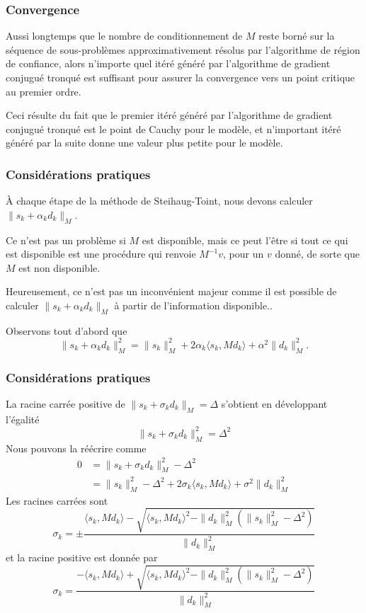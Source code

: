 \documentclass[usepdftitle=false]{beamer}
\begin{document}
\begin{frame}
\frametitle{Convergence}

Aussi longtemps que le nombre de conditionnement de $M$ reste borné sur la séquence de sous-problèmes approximativement résolus par l'algorithme de région de confiance, alors n'importe quel itéré généré par l'algorithme de gradient conjugué tronqué est suffisant pour assurer la convergence vers un point critique au premier ordre.

\mbox{}

Ceci résulte du fait que le premier itéré généré par l'algorithme de gradient conjugué tronqué est le point de Cauchy pour le modèle, et n'important itéré généré par la suite donne une valeur plus petite pour le modèle.

\end{frame}

\begin{frame}
\frametitle{Considérations pratiques}

À chaque étape de la méthode de Steihaug-Toint, nous devons calculer $\| s_k + \alpha_k d_k\|_M$.

\mbox{}

Ce n'est pas un problème si $M$ est disponible, mais ce peut l'être si tout ce qui est disponible est une procédure qui renvoie $M^{-1}v$, pour un $v$ donné, de sorte que $M$ est non disponible.

\mbox{}

Heureusement, ce n'est pas un inconvénient majeur comme il est possible de calculer  $\| s_k + \alpha_k d_k\|_M$ à partir de l'information disponible..

\mbox{}

Observons tout d'abord que
$$
\| s_k + \alpha_k d_k\|^2_M = \| s_k \|_M^2 + 2\alpha_k \langle s_k, Md_k \rangle
+ \alpha^2 \| d_k \|^2_M.
$$

\end{frame}

\begin{frame}
\frametitle{Considérations pratiques}

La racine carrée positive de $\| s_k + \sigma_k d_k\|_M = \Delta$ s'obtient en développant l'égalité
$$
\| s_k + \sigma_k d_k\|^2_M = \Delta^2
$$
Nous pouvons la réécrire comme
\begin{align*}
0 &= \| s_k + \sigma_k d_k\|^2_M - \Delta^2 \\
&= \| s_k \|_M^2 -  \Delta^2 + 2\sigma_k \langle s_k, Md_k \rangle
+ \sigma^2 \| d_k \|^2_M
\end{align*}
Les racines carrées sont
$$
\sigma_k = \pm \frac{\langle s_k, Md_k \rangle - \sqrt{\langle s_k, Md_k \rangle^2-\| d_k \|_M^2(\|s_k\|^2_M - \Delta^2 )}}{\| d_k \|_M^2}
$$
et la racine positive est donnée par
$$
\sigma_k = \frac{-\langle s_k, Md_k \rangle + \sqrt{\langle s_k, Md_k \rangle^2-\| d_k \|_M^2(\|s_k\|^2_M - \Delta^2 )}}{\| d_k \|_M^2}
$$

\end{frame}
\end{document}
